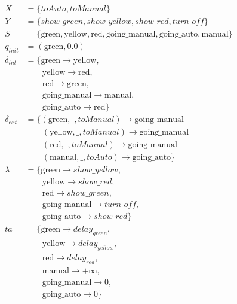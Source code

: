 \begin{align*}
X &= \{toAuto,toManual\}\\
Y &= \{show\_green,show\_yellow,show\_red,turn\_off\}\\
S &= \{\mathrm{green},\mathrm{yellow},\mathrm{red},\mathrm{going\_manual},\mathrm{going\_auto},\mathrm{manual}\}\\
q_{init} &= (\mathrm{green},0.0)\\
\delta_{int} &= \{\mathrm{green}\rightarrow\mathrm{yellow},\\
&\qquad\mathrm{yellow}\rightarrow\mathrm{red},\\
&\qquad\mathrm{red}\rightarrow\mathrm{green},\\
&\qquad\mathrm{going\_manual}\rightarrow\mathrm{manual},\\
&\qquad\mathrm{going\_auto}\rightarrow\mathrm{red}\}\\
\delta_{ext} &= \{(\mathrm{green},\_,toManual)\rightarrow\mathrm{going\_manual}\\
&\qquad(\mathrm{yellow},\_,toManual)\rightarrow\mathrm{going\_manual}\\
&\qquad(\mathrm{red},\_,toManual)\rightarrow\mathrm{going\_manual}\\
&\qquad(\mathrm{manual},\_,toAuto)\rightarrow\mathrm{going\_auto}\}\\
\lambda &= \{\mathrm{green}\rightarrow show\_yellow,\\
&\qquad\mathrm{yellow}\rightarrow show\_red,\\
&\qquad\mathrm{red}\rightarrow show\_green,\\
&\qquad\mathrm{going\_manual}\rightarrow turn\_off,\\
&\qquad\mathrm{going\_auto}\rightarrow show\_red\}\\
ta &= \{\mathrm{green}\rightarrow delay_{green},\\
&\qquad\mathrm{yellow}\rightarrow delay_{yellow},\\
&\qquad\mathrm{red}\rightarrow delay_{red},\\
&\qquad\mathrm{manual}\rightarrow+\infty,\\
&\qquad\mathrm{going\_manual}\rightarrow0,\\
&\qquad\mathrm{going\_auto}\rightarrow0\}
\end{align*}

